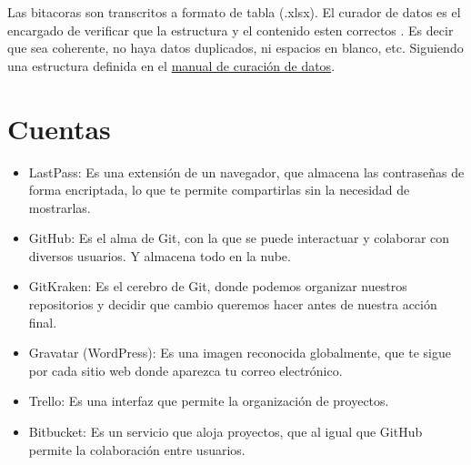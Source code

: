 \documentclass[12pt,letterpaper]{article}
\begin{document}
Las bitacoras son transcritos a formato de tabla (.xlsx). El curador de datos es el encargado de
verificar que la estructura y el contenido esten correctos \citep{it_user_2020}. Es decir que sea
coherente, no haya datos duplicados, ni espacios en blanco, etc. Siguiendo una estructura definida
en el \href{https://drive.google.com/drive/folders/1X-EdWtD6sxItwKmCyGpviCt85IvexRxo}{manual de
curación de datos}.

\section*{Cuentas}
\begin{itemize}
\item LastPass: Es una extensión de un navegador, que almacena las contraseñas de forma encriptada,
lo que te permite compartirlas sin la necesidad de mostrarlas.
\item GitHub: Es el alma de Git, con la que se puede interactuar y colaborar con diversos usuarios.
Y almacena todo en la nube.
\item GitKraken: Es el cerebro de Git, donde podemos organizar nuestros repositorios y decidir que
cambio queremos hacer antes de nuestra acción final.
\item Gravatar (WordPress): Es una imagen reconocida globalmente, que te sigue por cada sitio web
donde aparezca tu correo electrónico.
\item Trello: Es una interfaz que permite la organización de proyectos.
\item Bitbucket: Es un servicio que aloja proyectos, que al igual que GitHub permite la colaboración
entre usuarios.
\end{itemize}

 

\end{document}
